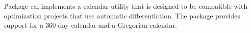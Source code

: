 Package cal implements a calendar utility that is designed to be compatible
with optimization projects that use automatic differentiation. The package
provides support for a 360-day calendar and a Gregorian calendar.


